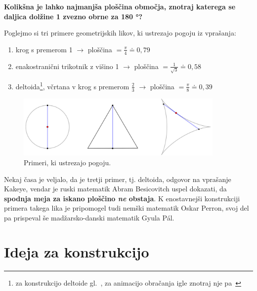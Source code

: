 \documentclass[a4paper, 12pt]{article}
\begin{document}
\vspace{0.2cm}
\begin{center}
    \textbf{Kolikšna je lahko najmanjša ploščina območja, znotraj katerega se daljica dolžine 1 zvezno obrne za 180 °?}
\end{center}
\vspace{0.2cm}

\noindent Poglejmo si tri primere geometrijskih likov, ki ustrezajo pogoju iz vprašanja:

\begin{enumerate}
    \item krog s premerom 1 $ \rightarrow $ ploščina $ = \frac{\pi}{4} \doteq 0{,}79 $
    \item enakostranični trikotnik z višino 1 $ \rightarrow $ ploščina $ = \frac{1}{\sqrt{3}} \doteq 0{,}58 $
    \item deltoida\footnote{za konstrukcijo deltoide gl.~\cite{deltoida}, za animacijo obračanja igle znotraj nje pa~\cite{kakeya_wiki}}, včrtana v krog s premerom $ \frac{2}{3} $ $ \rightarrow $ ploščina $ = \frac{\pi}{8} \doteq 0{,}39 $
\end{enumerate}

\begin{figure}[h!]
    \centering
    \includegraphics[width=0.9\textwidth]{geogebra_slike/prevelike_ploscine.png}
    \caption{Primeri, ki ustrezajo pogoju.}
    \label{primeri}
\end{figure}

Nekaj časa je veljalo, da je tretji primer, tj. deltoida, odgovor na vprašanje Kakeye, vendar je ruski matematik Abram Besicovitch uspel dokazati, da \textbf{spodnja meja za iskano ploščino \emph{ne} obstaja}. K enostavnejši konstrukciji primera takega lika je pripomogel tudi nemški matematik Oskar Perron, svoj del pa prispeval še madžarsko-danski matematik Gyula Pál.


\section*{Ideja za konstrukcijo}
\end{document}
